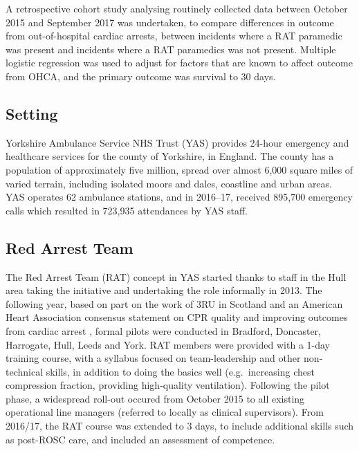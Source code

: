 \documentclass[]{article}
\theoremstyle{definition}
\theoremstyle{definition}
\theoremstyle{definition}
\theoremstyle{remark}
\begin{document}
A retrospective cohort study analysing routinely collected data between
October 2015 and September 2017 was undertaken, to compare differences
in outcome from out-of-hospital cardiac arrests, between incidents where
a RAT paramedic was present and incidents where a RAT paramedics was not
present. Multiple logistic regression was used to adjust for factors
that are known to affect outcome from OHCA, and the primary outcome was
survival to 30 days.

\hypertarget{setting}{%
\subsection{Setting}\label{setting}}

Yorkshire Ambulance Service NHS Trust (YAS) provides 24-hour emergency
and healthcare services for the county of Yorkshire, in England. The
county has a population of approximately five million, spread over
almost 6,000 square miles of varied terrain, including isolated moors
and dales, coastline and urban areas. YAS operates 62 ambulance
stations, and in 2016--17, received 895,700 emergency calls which
resulted in 723,935 attendances by YAS staff.

\hypertarget{red-arrest-team}{%
\subsection{Red Arrest Team}\label{red-arrest-team}}

The Red Arrest Team (RAT) concept in YAS started thanks to staff in the
Hull area taking the initiative and undertaking the role informally in
2013. The following year, based on part on the work of 3RU in Scotland
\citep{clarke_specialist_2014} and an American Heart Association
consensus statement on CPR quality and improving outcomes from cardiac
arrest \citep{meaney_cardiopulmonary_2013}, formal pilots were conducted
in Bradford, Doncaster, Harrogate, Hull, Leeds and York. RAT members
were provided with a 1-day training course, with a syllabus focused on
team-leadership and other non-technical skills, in addition to doing the
basics well (e.g.~increasing chest compression fraction, providing
high-quality ventilation). Following the pilot phase, a widespread
roll-out occured from October 2015 to all existing operational line
managers (referred to locally as clinical supervisors). From 2016/17,
the RAT course was extended to 3 days, to include additional skills such
as post-ROSC care, and included an assessment of competence.
\end{document}
